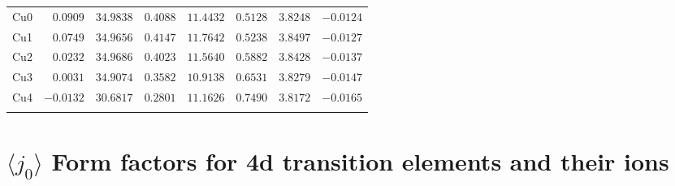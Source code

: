 \begin{table}[H]
{\begin{tabular}{lrrrrrrr}
Cu0 &$0.0909$ &$34.9838$ &$0.4088$ &$11.4432$ &$0.5128$ &$3.8248$ &$-0.0124$ \\
Cu1 &$0.0749$ &$34.9656$ &$0.4147$ &$11.7642$ &$0.5238$ &$3.8497$ &$-0.0127$ \\
Cu2 &$0.0232$ &$34.9686$ &$0.4023$ &$11.5640$ &$0.5882$ &$3.8428$ &$-0.0137$ \\
Cu3 &$0.0031$ &$34.9074$ &$0.3582$ &$10.9138$ &$0.6531$ &$3.8279$ &$-0.0147$ \\
Cu4 &$-0.0132$ &$30.6817$ &$0.2801$ &$11.1626$ &$0.7490$ &$3.8172$ &$-0.0165$ \\
\hline\\[-2ex]
\end{tabular}
}
\end{table}
\section{{\large$\langle j_0\rangle$ }Form factors for 4d transition elements and their ions}
